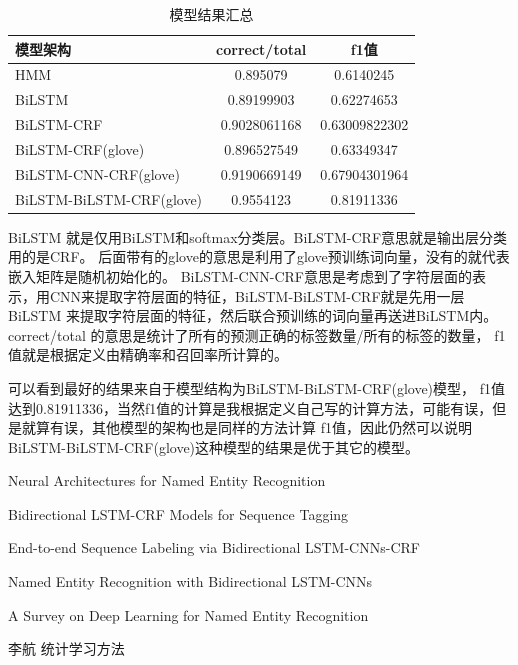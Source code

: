 \documentclass[openany,oneside]{ctexbook}
\begin{document}
\begin{table}[htp]
   \centering
   \begin{tabular}{|l|c|c|}
      \hline
      模型架构&correct/total&f1值 \\ \hline
      HMM&0.895079&0.6140245 \\ \hline
      BiLSTM&0.89199903&0.62274653 \\ \hline
      BiLSTM-CRF&0.9028061168&0.63009822302 \\ \hline
      BiLSTM-CRF(glove)&0.896527549&0.63349347 \\ \hline
      BiLSTM-CNN-CRF(glove)&0.9190669149&0.67904301964 \\ \hline
      BiLSTM-BiLSTM-CRF(glove)&0.9554123&0.81911336 \\ \hline 

      
   \end{tabular}
   \caption{模型结果汇总}
\end{table}
BiLSTM 就是仅用BiLSTM和softmax分类层。BiLSTM-CRF意思就是输出层分类用的是CRF。
后面带有的glove的意思是利用了glove预训练词向量，没有的就代表嵌入矩阵是随机初始化的。
BiLSTM-CNN-CRF意思是考虑到了字符层面的表示，用CNN来提取字符层面的特征，BiLSTM-BiLSTM-CRF就是先用一层BiLSTM
来提取字符层面的特征，然后联合预训练的词向量再送进BiLSTM内。
correct/total 的意思是统计了所有的预测正确的标签数量/所有的标签的数量，
f1值就是根据定义由精确率和召回率所计算的。

可以看到最好的结果来自于模型结构为BiLSTM-BiLSTM-CRF(glove)模型，
f1值达到0.81911336，当然f1值的计算是我根据定义自己写的计算方法，可能有误，但是就算有误，其他模型的架构也是同样的方法计算
f1值，因此仍然可以说明BiLSTM-BiLSTM-CRF(glove)这种模型的结果是优于其它的模型。

\begin{thebibliography}{99}

   \newblock Neural Architectures for Named Entity Recognition

   \newblock Bidirectional LSTM-CRF Models for Sequence Tagging

   \newblock End-to-end Sequence Labeling via Bidirectional LSTM-CNNs-CRF

   \newblock Named Entity Recognition with Bidirectional LSTM-CNNs

   \newblock A Survey on Deep Learning for Named Entity Recognition

   \newblock 李航
   \newblock 统计学习方法

   
   
   
   
   
   
   
   \end{thebibliography}
\end{document}
